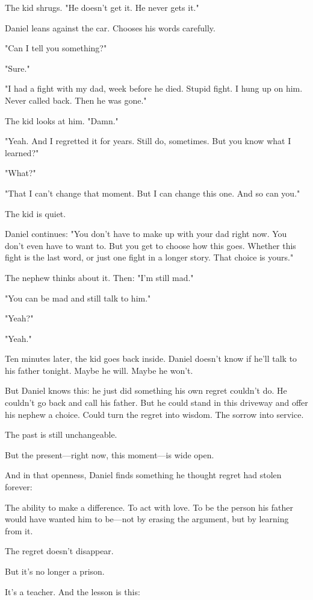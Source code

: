 \documentclass[11pt,twoside]{book}
\begin{document}
The kid shrugs. "He doesn't get it. He never gets it."

Daniel leans against the car. Chooses his words carefully.

"Can I tell you something?"

"Sure."

"I had a fight with my dad, week before he died. Stupid fight. I hung up on him. Never called back. Then he was gone."

The kid looks at him. "Damn."

"Yeah. And I regretted it for years. Still do, sometimes. But you know what I learned?"

"What?"

"That I can't change that moment. But I can change this one. And so can you."

The kid is quiet.

Daniel continues: "You don't have to make up with your dad right now. You don't even have to want to. But you get to choose how this goes. Whether this fight is the last word, or just one fight in a longer story. That choice is yours."

The nephew thinks about it. Then: "I'm still mad."

"You can be mad and still talk to him."

"Yeah?"

"Yeah."

Ten minutes later, the kid goes back inside. Daniel doesn't know if he'll talk to his father tonight. Maybe he will. Maybe he won't.

But Daniel knows this: he just did something his own regret couldn't do. He couldn't go back and call his father. But he could stand in this driveway and offer his nephew a choice. Could turn the regret into wisdom. The sorrow into service.

The past is still unchangeable.

But the present—right now, this moment—is wide open.

And in that openness, Daniel finds something he thought regret had stolen forever:

The ability to make a difference. To act with love. To be the person his father would have wanted him to be—not by erasing the argument, but by learning from it.

The regret doesn't disappear.

But it's no longer a prison.

It's a teacher. And the lesson is this:
\end{document}
